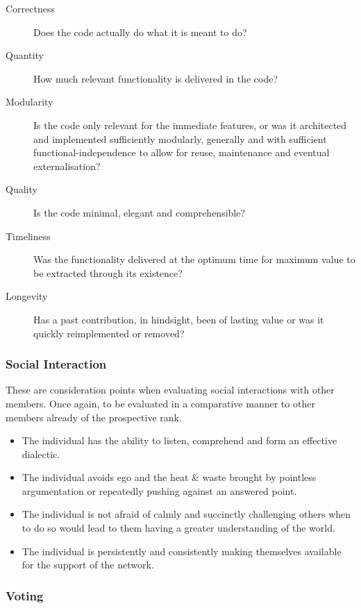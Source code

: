 \documentclass[9pt,oneside]{amsart}
\begin{document}
\begin{description}
  \item[Correctness] Does the code actually do what it is meant to do?
  \item[Quantity] How much relevant functionality is delivered in the code?
  \item[Modularity] Is the code only relevant for the immediate features, or was it architected and implemented sufficiently modularly, generally and with sufficient functional-independence to allow for reuse, maintenance and eventual externalisation?
  \item[Quality] Is the code minimal, elegant and comprehensible?
  \item[Timeliness] Was the functionality delivered at the optimum time for maximum value to be extracted through its existence?
  \item[Longevity] Has a past contribution, in hindsight, been of lasting value or was it quickly reimplemented or removed?
\end{description}

\subsubsection{Social Interaction}

These are consideration points when evaluating social interactions with other members. Once again, to be evaluated in a comparative manner to other members already of the prospective rank.

\begin{itemize}
  \item The individual has the ability to listen, comprehend and form an effective dialectic.
  \item The individual avoids ego and the heat \& waste brought by pointless argumentation or repeatedly pushing against an answered point.
  \item The individual is not afraid of calmly and succinctly challenging others when to do so would lead to them having a greater understanding of the world.
  \item The individual is persistently and consistently making themselves available for the support of the network.
\end{itemize}

\subsubsection{Voting}
\end{document}
